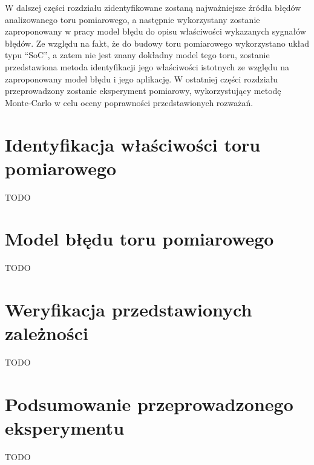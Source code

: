 W dalszej części rozdziału zidentyfikowane zostaną najważniejsze źródła błędów analizowanego toru pomiarowego, a następnie wykorzystany zostanie zaproponowany w pracy model błędu do opisu właściwości wykazanych sygnałów błędów. Ze względu na fakt, że do budowy toru pomiarowego wykorzystano układ typu \enquote{SoC}, a zatem nie jest znany dokładny model tego toru, zostanie przedstawiona metoda identyfikacji jego właściwości istotnych ze względu na zaproponowany model błędu i jego aplikację. W ostatniej części rozdziału przeprowadzony zostanie eksperyment pomiarowy, wykorzystujący metodę Monte-Carlo w celu oceny poprawności przedstawionych rozważań.

\section{Identyfikacja właściwości toru pomiarowego}

TODO

\section{Model błędu toru pomiarowego}

TODO

\section{Weryfikacja przedstawionych zależności}

TODO

\section{Podsumowanie przeprowadzonego eksperymentu}

TODO

